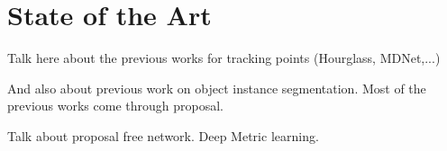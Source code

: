 
%
\newpage
\chapter{State of the Art}



Talk here about the previous works for tracking points (Hourglass, MDNet,...)

And also about previous work on object instance segmentation.
Most of the previous works come through proposal.

Talk about proposal free network. Deep Metric learning.
